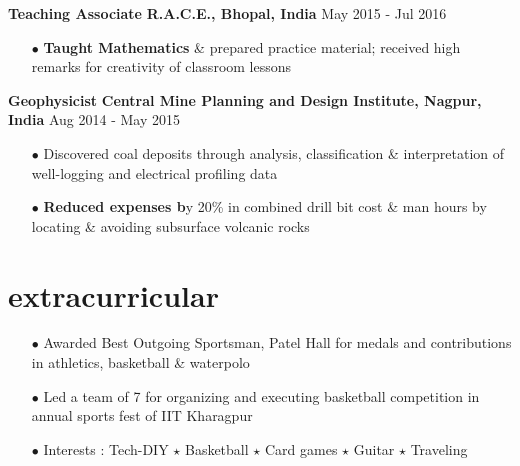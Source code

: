 \documentclass[a4paper, 10pt, oneside]{article}
\newcommand{\bulltetspace}{\vspace{-0.2em}}
\begin{document}
\begin{center}
\begin{itemize}
\end{itemize}

\color{headings}\textbf{Teaching Associate}  \hfill \textbf{R.A.C.E., Bhopal, India} \hfill May 2015 - Jul 2016
\color{text1}
\vspace{-0.3em}
\begin{itemize}
\bulltetspace
\item[$\bullet$] \textbf{Taught Mathematics} \& prepared practice material; received high remarks for creativity of classroom lessons\\
\end{itemize}

\color{headings}\textbf{Geophysicist}  \hfill \textbf{Central Mine Planning and Design Institute, Nagpur, India} \hfill Aug 2014 - May 2015
\color{text1}
\vspace{-0.3em}
\begin{itemize}
\bulltetspace
\item[$\bullet$] Discovered coal deposits through analysis, classification \& interpretation of well-logging and electrical profiling data\\ 
\bulltetspace
\item[$\bullet$] \textbf{Reduced expenses b}y 20\% in combined drill bit cost \& man hours by locating \& avoiding subsurface volcanic rocks\\
\bulltetspace
\end{itemize}

\end{center}

\vspace{-0.5em}
\section{\color{headings}extracurricular}
\color{text1}
\begin{center}
\begin{itemize}
\bulltetspace
\item[$\bullet$] Awarded Best Outgoing Sportsman, Patel Hall for medals and contributions in athletics, basketball \& waterpolo\\
\bulltetspace
\item[$\bullet$] Led a team of 7 for organizing and executing basketball competition in annual sports fest of IIT Kharagpur\\
\bulltetspace
\item[$\bullet$] Interests :  Tech-DIY $\star$ Basketball $\star$ Card games $\star$ Guitar $\star$ Traveling 

\bulltetspace
\end{itemize}
\end{center}
\vspace{-1em}
\end{document}
